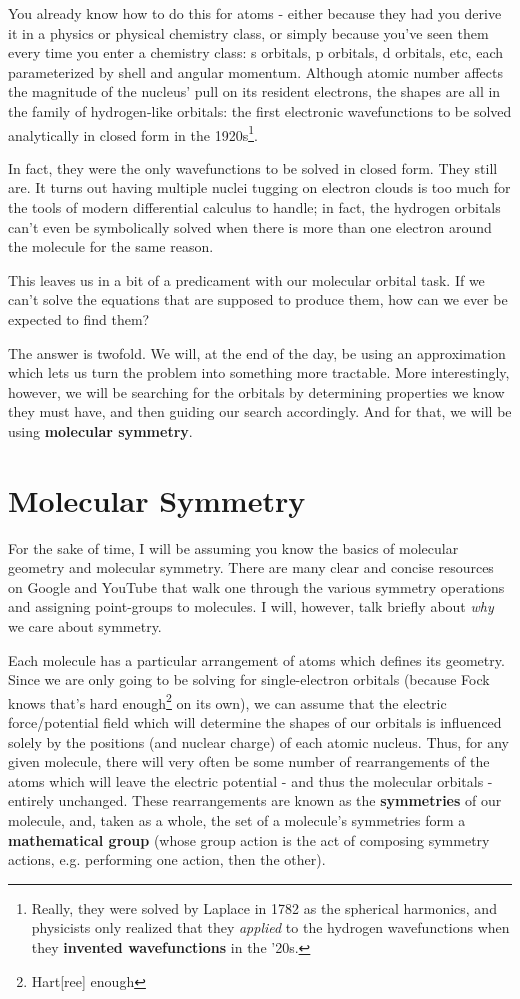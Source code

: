 \documentclass{article}
\begin{document}
You already know how to do this for atoms - either because they had you derive it in a physics or physical chemistry class, or simply because you've seen them every time you enter a chemistry class: s orbitals, p orbitals, d orbitals, etc, each parameterized by shell and angular momentum. Although atomic number affects the magnitude of the nucleus' pull on its resident electrons, the shapes are all in the family of hydrogen-like orbitals: the first electronic wavefunctions to be solved analytically in closed form in the 1920s\footnote{Really, they were solved by Laplace in 1782 as the spherical harmonics, and physicists only realized that they \textit{applied} to the hydrogen wavefunctions when they \textbf{invented wavefunctions} in the '20s.}. 

In fact, they were the only wavefunctions to be solved in closed form. They still are. It turns out having multiple nuclei tugging on electron clouds is too much for the tools of modern differential calculus to handle; in fact, the hydrogen orbitals can't even be symbolically solved when there is more than one electron around the molecule for the same reason. 

This leaves us in a bit of a predicament with our molecular orbital task. If we can't solve the equations that are supposed to produce them, how can we ever be expected to find them?

The answer is twofold. We will, at the end of the day, be using an approximation which lets us turn the problem into something more tractable. More interestingly, however, we will be searching for the orbitals by determining properties we know they must have, and then guiding our search accordingly. And for that, we will be using \textbf{molecular symmetry}.


\section{Molecular Symmetry}
For the sake of time, I will be assuming you know the basics of molecular geometry and molecular symmetry. There are many clear and concise resources on Google and YouTube that walk one through the various symmetry operations and assigning point-groups to molecules. I will, however, talk briefly about \textit{why} we care about symmetry.

Each molecule has a particular arrangement of atoms which defines its geometry. Since we are only going to be solving for single-electron orbitals (because Fock knows that's hard enough\footnote{Hart[ree] enough} on its own), we can assume that the electric force/potential field which will determine the shapes of our orbitals is influenced solely by the positions (and nuclear charge) of each atomic nucleus. Thus, for any given molecule, there will very often be some number of rearrangements of the atoms which will leave the electric potential - and thus the molecular orbitals - entirely unchanged. These rearrangements are known as the \textbf{symmetries} of our molecule, and, taken as a whole, the set of a molecule's symmetries form a \textbf{mathematical group} (whose group action is the act of composing symmetry actions, e.g. performing one action, then the other).
\end{document}
